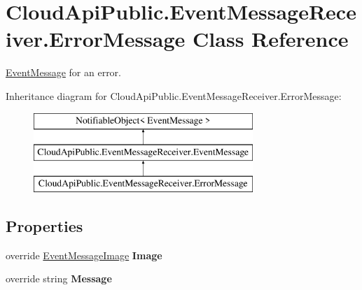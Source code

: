 \hypertarget{class_cloud_api_public_1_1_event_message_receiver_1_1_error_message}{\section{Cloud\-Api\-Public.\-Event\-Message\-Receiver.\-Error\-Message Class Reference}
\label{class_cloud_api_public_1_1_event_message_receiver_1_1_error_message}
}


\hyperlink{class_cloud_api_public_1_1_event_message_receiver_1_1_event_message}{Event\-Message} for an error.  


Inheritance diagram for Cloud\-Api\-Public.\-Event\-Message\-Receiver.\-Error\-Message\-:\begin{figure}[H]
\begin{center}
\leavevmode
\includegraphics[height=3.000000cm]{class_cloud_api_public_1_1_event_message_receiver_1_1_error_message}
\end{center}
\end{figure}
\subsection*{Properties}
\begin{DoxyCompactItemize}
\item 
\hypertarget{class_cloud_api_public_1_1_event_message_receiver_1_1_error_message_a43ae4a77f9d7d832966cf693b2949d74}{override \hyperlink{namespace_cloud_api_public_1_1_static_aefcc1e7e1c81366ec3f6affd41c1f817}{Event\-Message\-Image} {\bfseries Image}}\label{class_cloud_api_public_1_1_event_message_receiver_1_1_error_message_a43ae4a77f9d7d832966cf693b2949d74}

\item 
\hypertarget{class_cloud_api_public_1_1_event_message_receiver_1_1_error_message_a129477aeb39fd7ad944e542f5df9ed39}{override string {\bfseries Message}}\label{class_cloud_api_public_1_1_event_message_receiver_1_1_error_message_a129477aeb39fd7ad944e542f5df9ed39}

\end{DoxyCompactItemize}

